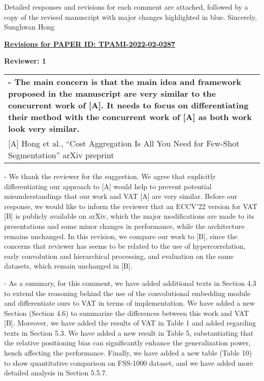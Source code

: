 \documentclass[11pt,draftclsnofoot,onecolumn]{IEEEtran}
\begin{document}
\noindent Detailed responses and revisions for each comment are attached, followed by a copy of the revised manuscript with major changes highlighted in blue. 
\newline
\newline
Sincerely,
\newline
\noindent Sunghwan Hong

\newpage

\hspace{1.4cm}\LARGE\underline{\textbf{Revisions for PAPER ID: TPAMI-2022-02-0287}}
\newline
\newline

\noindent \large\textbf{Reviewer: 1}

\begin{longtable}{|p{16cm}|}
	\hline 
	
	
	\textbf{
	- The main concern is that the main idea and framework proposed in the manuscript are very similar to the concurrent work of [A]. It needs to focus on differentiating their method with the concurrent work of [A] as both work look very similar.}\\
	
	[A] Hong et al., “Cost Aggregation Is All You Need for Few-Shot Segmentation” arXiv preprint\\
	

	\hline
\end{longtable}
- We thank the reviewer for the suggestion. We agree that explicitly differentiating our approach to [A] would help to prevent potential misunderstandings that our work and VAT [A] are very similar. Before our response, we would like to inform the reviewer that an ECCV'22 version for VAT [B] is publicly available on arXiv, which the major modifications are made to its presentations and some minor changes in performance, while the architecture remains unchanged. In this revision, we compare our work to [B], since the concerns that reviewer has seems to be related to the use of hypercorrelation, early convolution and hierarchical processing, and evaluation on the same datasets, which remain unchanged in [B]. 

- As a summary, for this comment, we have added additional texts in Section 4.3 to extend the reasoning behind the use of the convolutional embedding module and differentiate ours to VAT in terms of implementation. We have added a new Section (Section 4.6) to summarize the differences between this work and VAT [B]. Moreover, we have added the results of VAT in Table 1 and added  regarding texts in Section 5.3. We have added a new result in Table 5, substantiating that the relative positioning bias can significantly enhance the generalization power, hench affecting the performance. Finally, we have added a new table (Table 10) to show quantitative comparison on FSS-1000 dataset, and we have added more detailed analysis in Section 5.5.7.  
\end{document}
